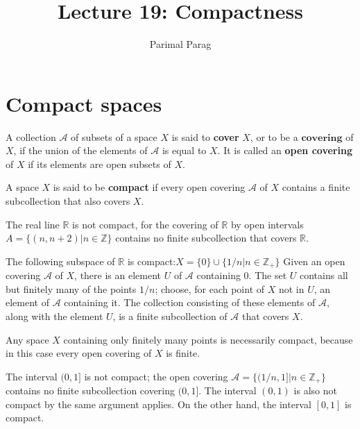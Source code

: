 \documentclass[a4paper,english,12pt]{article}
\title{Lecture 19: Compactness}
\author{Parimal Parag}
\begin{document}
\maketitle

\section{Compact spaces}
\begin{defn}
	A collection $\mathcal{A}$ of subsets of a space $X$ is said to \textbf{cover} $X$, or to be a $\textbf{covering}$ of $X$, if the union of the elements of $\mathcal{A}$ is equal to $X$. It is called an \textbf{open covering} of $X$ if its elements are open subsets of $X$.
\end{defn}
	
\begin{defn}	
	A space $X$ is said to be \textbf{compact} if every open covering $\mathcal{A}$ of $X$ contains a finite subcollection that also covers $X$.
\end{defn}	

\begin{exmp}
	The real line $\mathbb{R}$ is not compact, for the covering of $\mathbb{R}$ by open intervals $A = \{(n,n+2) | n \in \mathbb{Z}\}$
	contains no finite subcollection that covers $\mathbb{R}$.
\end{exmp}

\begin{exmp}
	The following subspace of $\mathbb{R}$ is compact:$ X= \{0\} \cup \{1/n | n \in \mathbb{Z_+}\} $
	Given an open covering $\mathcal{A}$ of $X$, there is an element $U$ of $\mathcal{A}$ containing $0$. The set $U$ contains all but finitely many of the points $1/n$; choose, for each point of $X$ not in $U$, an element of $\mathcal{A}$ containing it. The collection consisting of these elements of $\mathcal{A}$, along with the element $U$, is a finite subcollection of $\mathcal{A}$ that covers $X$.
\end{exmp}

\begin{exmp}
	Any space $X$ containing only finitely many points is necessarily compact, because in this case every open covering of $X$ is finite.
\end{exmp}

\begin{exmp}
	The interval $(0,1]$ is not compact; the open covering
	$	\mathcal{A} = \{(1/n,1] | n \in \mathbb{Z_+}\}  $
	contains no finite subcollection covering $(0, 1]$. The interval $(0, 1)$ is also not compact by the same argument applies. On the other hand, the interval $[0, 1]$ is compact.
\end{exmp}
\end{document}
